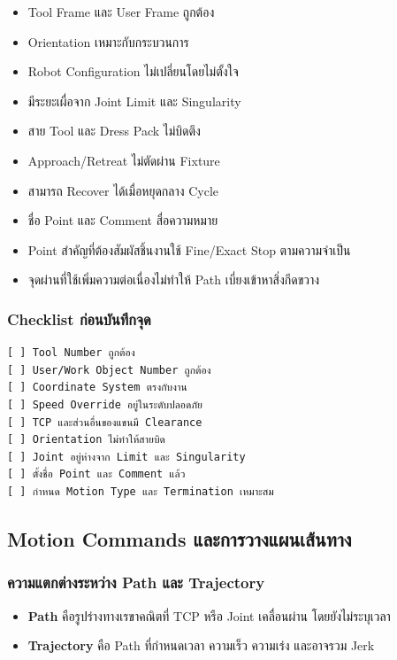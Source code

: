\begin{itemize}
    \item Tool Frame และ User Frame ถูกต้อง
    \item Orientation เหมาะกับกระบวนการ
    \item Robot Configuration ไม่เปลี่ยนโดยไม่ตั้งใจ
    \item มีระยะเผื่อจาก Joint Limit และ Singularity
    \item สาย Tool และ Dress Pack ไม่บิดตึง
    \item Approach/Retreat ไม่ตัดผ่าน Fixture
    \item สามารถ Recover ได้เมื่อหยุดกลาง Cycle
    \item ชื่อ Point และ Comment สื่อความหมาย
    \item Point สำคัญที่ต้องสัมผัสชิ้นงานใช้ Fine/Exact Stop ตามความจำเป็น
    \item จุดผ่านที่ใช้เพิ่มความต่อเนื่องไม่ทำให้ Path เบี่ยงเข้าหาสิ่งกีดขวาง
\end{itemize}

\subsubsection{Checklist ก่อนบันทึกจุด}

\begin{verbatim}
[ ] Tool Number ถูกต้อง
[ ] User/Work Object Number ถูกต้อง
[ ] Coordinate System ตรงกับงาน
[ ] Speed Override อยู่ในระดับปลอดภัย
[ ] TCP และส่วนอื่นของแขนมี Clearance
[ ] Orientation ไม่ทำให้สายบิด
[ ] Joint อยู่ห่างจาก Limit และ Singularity
[ ] ตั้งชื่อ Point และ Comment แล้ว
[ ] กำหนด Motion Type และ Termination เหมาะสม
\end{verbatim}



\subsection{Motion Commands และการวางแผนเส้นทาง}

\subsubsection{ความแตกต่างระหว่าง Path และ Trajectory}

\begin{itemize}
    \item \textbf{Path} คือรูปร่างทางเรขาคณิตที่ TCP หรือ Joint เคลื่อนผ่าน โดยยังไม่ระบุเวลา
    \item \textbf{Trajectory} คือ Path ที่กำหนดเวลา ความเร็ว ความเร่ง และอาจรวม Jerk
\end{itemize}

